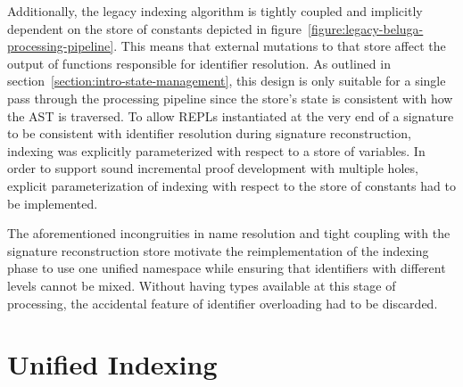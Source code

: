 Additionally, the legacy indexing algorithm is tightly coupled and implicitly dependent on the store of constants depicted in figure~\ref{figure:legacy-beluga-processing-pipeline}.
This means that external mutations to that store affect the output of functions responsible for identifier resolution.
As outlined in section~\ref{section:intro-state-management}, this design is only suitable for a single pass through the processing pipeline since the store's state is consistent with how the \ac{AST} is traversed.
To allow \acp{REPL} instantiated at the very end of a \Beluga signature to be consistent with identifier resolution during signature reconstruction, indexing was explicitly parameterized with respect to a store of variables.
In order to support sound incremental proof development with multiple holes, explicit parameterization of indexing with respect to the store of constants had to be implemented.

The aforementioned incongruities in name resolution and tight coupling with the signature reconstruction store motivate the reimplementation of the indexing phase to use one unified namespace while ensuring that identifiers with different levels cannot be mixed.
Without having types available at this stage of processing, the accidental feature of identifier overloading had to be discarded.



\section{Unified Indexing}\label{section:indexing}


